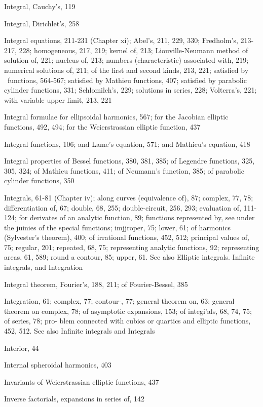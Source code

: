Integral, Cauchy's, 119

Integral, Dirichlet's, 258

Integral equations, 211-231 (Chapter xi); Abel's, 211, 229, 330; Fredholm's, 213-217, 228;
homogeneous, 217, 219; kernel of, 213; Liouville-Neumann method of solution of, 221;
nucleus of, 213; numbers (characteristic) associated with, 219; numerical solutions of, 211;
of the first and second kinds, 213, 221; satisfied by \Lame\ functions, 564-567; satisfied by
Mathieu functions, 407; satisfied by parabolic cylinder functions, 331; Schlomilch's, 229;
solutions in series, 228; Volterra's, 221; with variable upper limit, 213, 221

Integral formulae for ellipsoidal harmonics, 567; for the Jacobian elliptic functions, 492, 494;
for the Weierstrassian elliptic function, 437

Integral functions, 106; and Lame's equation, 571; and Mathieu's equation, 418

Integral properties of Bessel functions, 380, 381, 385; of Legendre functions, 325, 305, 324; of
Mathieu functions, 411; of Neumann's function, 385; of parabolic cylinder functions, 350

Integrals, 61-81 (Chapter iv); along curves (equivalence of), 87; complex, 77, 78; differentiation
of, 67; double, 68, 255; double-circuit, 256, 293; evaluation of, 111-124; for derivates of an
analytic function, 89; functions represented by, see under the juinies of the special functions;
imjjroper, 75; lower, 61; of harmonics (Sylvester's theorem), 400; of irrational functions,
452, 512; principal values of, 75; regular, 201; repeated,
68, 75; representing analytic functions, 92; representing areas, 61, 589; round a contour,
85; upper, 61. See also Elliptic integrals. Infinite integrals, and Integration

Integral theorem, Fourier's, 188, 211; of Fourier-Bessel, 385

Integration, 61; complex, 77; contour-, 77; general theorem on, 63; general theorem on
complex, 78; of asymptotic expansions, 153; of integi'als, 68, 74, 75; of series, 78; pro-
blem connected with cubics or quartics and elliptic functions, 452, 512. See also Infinite
integrals and Integrals

Interior, 44

Internal spheroidal harmonics, 403

Invariants of Weierstrassian elliptic functions, 437

Inverse factorials, expansions in series of, 142

